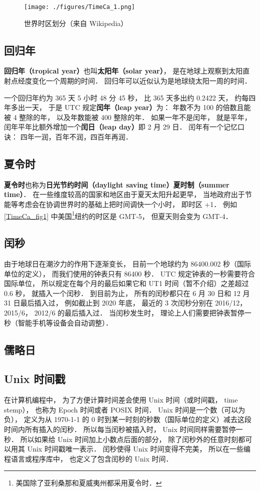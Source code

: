 \begin{figure}[ht]
\centering
\texttt{[image: ./figures/TimeCa\_1.png]}
\caption{世界时区划分（来自 Wikipedia）} \label{TimeCa_fig1}
\end{figure}

\subsection{回归年}
\textbf{回归年（tropical year）}也叫\textbf{太阳年（solar year）}， 是在地球上观察到太阳直射点经度变化一个周期的时间． 回归年可以近似认为是地球绕太阳一周的时间．

一个回归年约为 365 天 5 小时 48 分 45 秒， 比 365 天多出约 0.2422 天， 约每四年多出一天， 于是 UTC 规定\textbf{闰年（leap year）}为： 年数不为 100 的倍数且能被 4 整除的年， 以及年数能被 400 整除的年． 如果一年不是闰年， 就是平年， 闰年平年比额外增加一个\textbf{闰日（leap day）}即 2 月 29 日． 闰年有一个记忆口诀： 四年一润，百年不润，四百年再润．

\subsection{夏令时}
\textbf{夏令时}也称为\textbf{日光节约时间（daylight saving time）}\textbf{夏时制（summer time）}． 在一些维度较高的国家和地区由于夏天太阳升起更早， 当地政府出于节能等考虑会在协调世界时的基础上把时间调快一个小时， 即时区 +1． 例如\autoref{TimeCa_fig1} 中美国\footnote{美国除了亚利桑那和夏威夷州都采用夏令时．}纽约的时区是 GMT-5， 但夏天则会变为 GMT-4．

\subsection{闰秒}
由于地球日在潮汐力的作用下逐渐变长， 目前一个地球约为 86400.002 秒（国际单位的定义）， 而我们使用的钟表只有 86400 秒． UTC 规定钟表的一秒需要符合国际单位， 所以规定在每个月的最后如果它和 UT1 时间（暂不介绍）之差超过 0.6 秒， 就插入一个闰秒． 到目前为止， 所有的闰秒都只在 6 月 30 日和 12 月 31 日最后插入过， 例如截止到 2020 年底， 最近的 3 次闰秒分别在 2016/12， 2015/6， 2012/6 的最后插入过． 当闰秒发生时， 理论上人们需要把钟表暂停一秒（智能手机等设备会自动调整）．

\subsection{儒略日}


\subsection{Unix 时间戳}
在计算机编程中， 为了方便计算时间差会使用 Unix 时间（或时间戳， time stemp）， 也称为 Epoch 时间或者 POSIX 时间． Unix 时间是一个数（可以为负）， 定义为从 1970-1-1 的 0 时到某一时刻的秒数（国际单位的定义）减去这段时间内所有插入的闰秒． 所以每当闰秒被插入时， Unix 时间同样需要暂停一秒． 所以如果给 Unix 时间加上小数点后面的部分， 除了闰秒外的任意时刻都可以用其 Unix 时间戳唯一表示． 闰秒使得 Unix 时间变得不完美， 所以在一些编程语言或程序库中， 也定义了包含闰秒的 Unix 时间．
